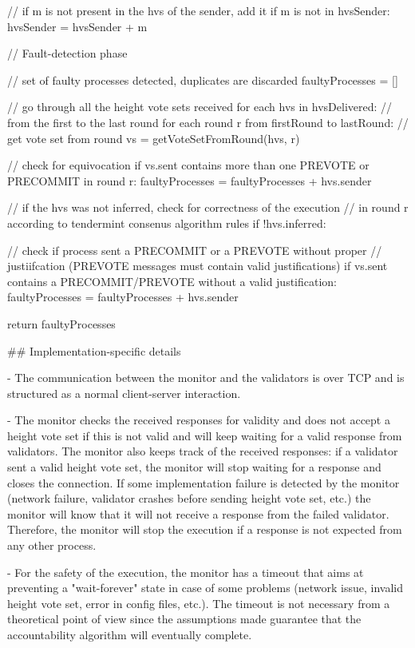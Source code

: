 \documentclass[a4paper,11pt,oneside]{report}
\begin{document}
\begin{markdown}
                // if m is not present in the hvs of the sender, add it
                if m is not in hvsSender:
                    hvsSender = hvsSender + m
                    
        // Fault-detection phase
        
        // set of faulty processes detected, duplicates are discarded
        faultyProcesses = []
        
        // go through all the height vote sets received
        for each hvs in hvsDelivered:
            // from the first to the last round    
            for each round r from firstRound to lastRound: 
                // get vote set from round
                vs = getVoteSetFromRound(hvs, r)
                
                // check for equivocation
                if vs.sent contains more than one PREVOTE or PRECOMMIT in round r:
                    faultyProcesses = faultyProcesses + hvs.sender                
                
                // if the hvs was not inferred, check for correctness of the execution
                // in round r according to tendermint consenus algorithm rules  
                if !hvs.inferred:
                    
                    // check if process sent a PRECOMMIT or a PREVOTE without proper
                    // justiifcation (PREVOTE messages must contain valid justifications) 
                    if vs.sent contains a PRECOMMIT/PREVOTE without a valid justification:
                        faultyProcesses = faultyProcesses + hvs.sender
                        
                        
        return faultyProcesses
        
                
## Implementation-specific details

- The communication between the monitor and the validators is over TCP and is structured as a normal client-server interaction.  

- The monitor checks the received responses for validity and does not accept a height vote set if this is not valid and will keep waiting for a valid response from validators. 
The monitor also keeps track of the received responses: if a validator sent a valid height vote set, the monitor will stop waiting for a response and closes the connection.
If some implementation failure is detected by the monitor (network failure, validator crashes before sending height vote set, etc.) the monitor will know that it will not receive a response from the failed validator. 
Therefore, the monitor will stop the execution if a response is not expected from any other process. 

- For the safety of the execution, the monitor has a timeout that aims at preventing a "wait-forever" state in case of some problems (network issue, invalid height vote set, error in config files, etc.). The timeout is not necessary from a theoretical point of view since the assumptions made guarantee that the accountability algorithm will eventually complete.

\end{markdown}
\end{document}
